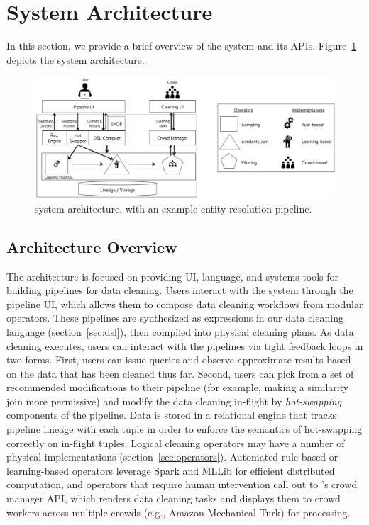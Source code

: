 \section{System Architecture}

In this section, we provide a brief overview of the \sys system and its APIs.
Figure~\ref{fig:arch} depicts the system architecture.

\begin{figure}[ht]
\centering
\includegraphics[width = \textwidth]{figs/architecture.png}
\caption{\sys system architecture, with an example entity resolution pipeline.}
\label{fig:arch}
\end{figure}

\subsection{Architecture Overview}
The \sys architecture is focused on providing UI, language, and systems tools for building pipelines for data cleaning. 
Users interact with the system through the pipeline UI, which allows them to compose data cleaning workflows from modular operators.
These pipelines are synthesized as expressions in our data cleaning language (section~\ref{sec:dsl}), then compiled into physical cleaning plans.
As data cleaning executes, users can interact with the pipelines via tight feedback loops in two forms.
First, users can issue queries and observe approximate results based on the data that has been cleaned thus far.
Second, users can pick from a set of recommended modifications to their pipeline (for example, making a similarity join more permissive) and modify the data cleaning in-flight by \textit{hot-swapping} components of the pipeline.
Data is stored in a relational engine that tracks pipeline lineage with each tuple in order to enforce the semantics of hot-swapping correctly on in-flight tuples.
Logical cleaning operators may have a number of physical implementations (section~\ref{sec:operators}).
Automated rule-based or learning-based operators leverage Spark and MLLib for efficient distributed computation, and operators that require human intervention call out to \sys's crowd manager API, which renders data cleaning tasks and displays them to crowd workers across multiple crowds (e.g., Amazon Mechanical Turk) for processing.

